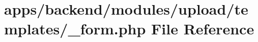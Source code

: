\hypertarget{backend_2modules_2upload_2templates_2__form_8php}{\section{apps/backend/modules/upload/templates/\-\_\-form.php File Reference}
\label{backend_2modules_2upload_2templates_2__form_8php}
}
